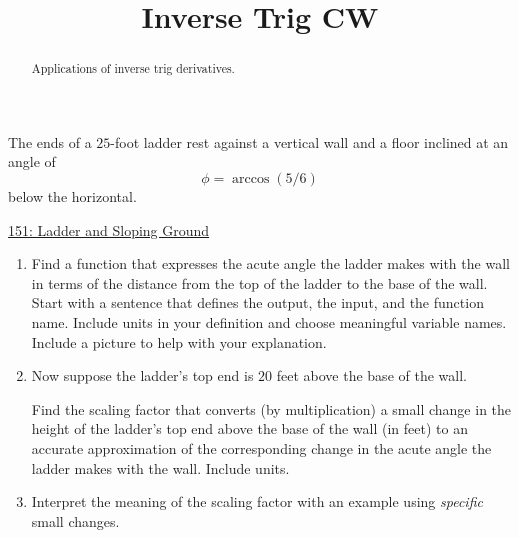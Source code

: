\documentclass{ximera}
\title{Inverse Trig CW}
\begin{document}
\begin{abstract}
Applications of inverse trig derivatives.
\end{abstract}
\maketitle

\begin{question} \label{Qpfefd9311}
The ends of a $25$-foot ladder rest against a vertical wall and a floor inclined at an angle of
\[
     \phi = \arccos(5/6)
\]
below the horizontal.


\begin{onlineOnly}
    \begin{center}
\end{center}
\end{onlineOnly}

\href{https://www.desmos.com/calculator/q2g6qqwlzc}{151: Ladder and Sloping Ground}

\begin{enumerate}

\item Find a function that expresses the acute angle the ladder makes with the wall in terms of the distance from the top of the ladder to the base of the wall. Start with a sentence that defines the output, the input, and the function name. Include units in your definition and choose meaningful variable names. Include a picture to help with your explanation.

\item Now suppose the ladder's top end is $20$ feet above the base of the wall.

Find the  scaling factor that converts (by multiplication) a small change in the height of the ladder's top end above the base of the wall (in feet) to an accurate approximation of the corresponding change in the acute angle the ladder makes with the wall. Include units.

\item Interpret the meaning of the scaling factor with an example using \emph{specific} small changes.



\end{enumerate}



\end{question}
\end{document}
